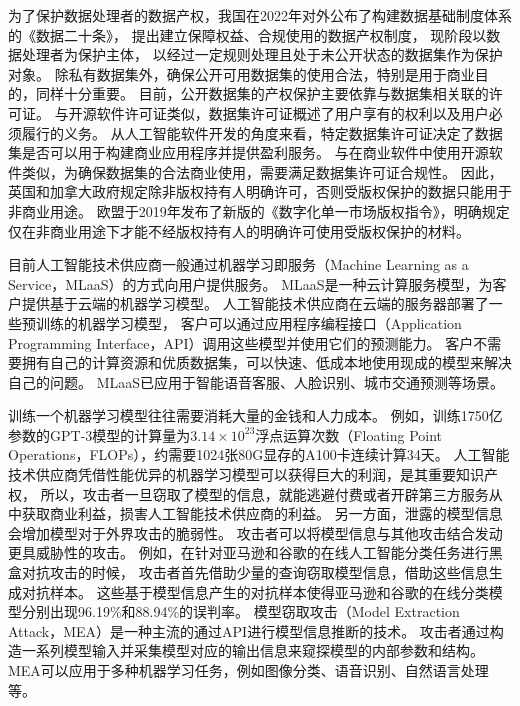 为了保护数据处理者的数据产权，我国在2022年对外公布了构建数据基础制度体系的《数据二十条》，
提出建立保障权益、合规使用的数据产权制度，
现阶段以数据处理者为保护主体，
以经过一定规则处理且处于未公开状态的数据集作为保护对象。
除私有数据集外，确保公开可用数据集的使用合法，特别是用于商业目的，同样十分重要。
目前，公开数据集的产权保护主要依靠与数据集相关联的许可证。
与开源软件许可证类似，数据集许可证概述了用户享有的权利以及用户必须履行的义务。
从人工智能软件开发的角度来看，特定数据集许可证决定了数据集是否可以用于构建商业应用程序并提供盈利服务。
与在商业软件中使用开源软件类似，为确保数据集的合法商业使用，需要满足数据集许可证合规性。
因此，英国和加拿大政府规定除非版权持有人明确许可，否则受版权保护的数据只能用于非商业用途\cite{Infringement2022}。
欧盟于2019年发布了新版的《数字化单一市场版权指令》，明确规定仅在非商业用途下才能不经版权持有人的明确许可使用受版权保护的材料\cite{triaille2014study}。

目前人工智能技术供应商一般通过机器学习即服务（Machine Learning as a Service，MLaaS）的方式向用户提供服务。
MLaaS是一种云计算服务模型，为客户提供基于云端的机器学习模型。
人工智能技术供应商在云端的服务器部署了一些预训练的机器学习模型，
客户可以通过应用程序编程接口（Application Programming Interface，API）调用这些模型并使用它们的预测能力。
客户不需要拥有自己的计算资源和优质数据集，可以快速、低成本地使用现成的模型来解决自己的问题。 MLaaS已应用于智能语音客服、人脸识别、城市交通预测等场景。

训练一个机器学习模型往往需要消耗大量的金钱和人力成本。
例如，训练1750亿参数的GPT-3模型的计算量为$3.14\times10^{23}$浮点运算次数（Floating Point Operations，FLOPs），约需要1024张80G显存的A100卡连续计算34天\cite{DBLP:conf/nips/BrownMRSKDNSSAA20}。
人工智能技术供应商凭借性能优异的机器学习模型可以获得巨大的利润，是其重要知识产权，
所以，攻击者一旦窃取了模型的信息，就能逃避付费或者开辟第三方服务从中获取商业利益，损害人工智能技术供应商的利益。
另一方面，泄露的模型信息会增加模型对于外界攻击的脆弱性。
攻击者可以将模型信息与其他攻击结合发动更具威胁性的攻击。
例如，在针对亚马逊和谷歌的在线人工智能分类任务进行黑盒对抗攻击的时候，
攻击者首先借助少量的查询窃取模型信息，借助这些信息生成对抗样本。
这些基于模型信息产生的对抗样本使得亚马逊和谷歌的在线分类模型分别出现96.19\%和88.94\%的误判率\cite{DBLP:conf/ccs/PapernotMGJCS17}。
模型窃取攻击（Model Extraction Attack，MEA）是一种主流的通过API进行模型信息推断的技术\cite{DBLP:conf/uss/TramerZJRR16, DBLP:conf/sp/WangG18, DBLP:conf/nips/CravenS95, DBLP:conf/uss/JagielskiCBKP20, DBLP:conf/cvpr/TruongMWP21, DBLP:conf/crypto/CarliniJM20}。
攻击者通过构造一系列模型输入并采集模型对应的输出信息来窥探模型的内部参数和结构。
MEA可以应用于多种机器学习任务，例如图像分类、语音识别、自然语言处理等。


